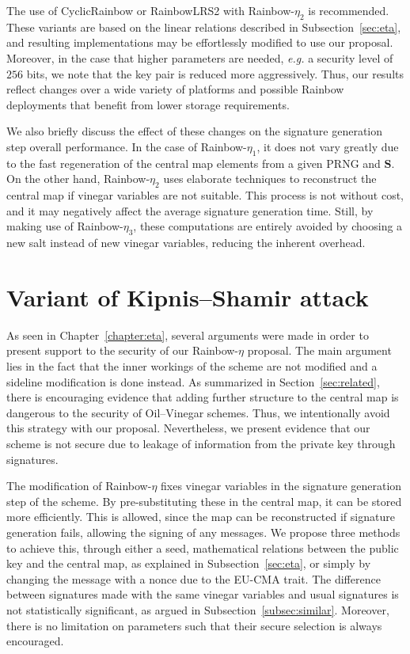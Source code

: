 \documentclass[12pt, a4paper, oneside]{memoir}
\theoremstyle{definition}
\begin{document}
The use of CyclicRainbow or RainbowLRS2 with Rainbow-$\eta_{2}$ is
recommended. These variants are based on the linear relations described in
Subsection~\ref{sec:eta}, and resulting implementations may be
effortlessly modified to use our proposal. Moreover, in the case that higher
parameters are needed, \emph{e.g.} a security level of $256$ bits, we note that
the key pair is reduced more aggressively. Thus, our results reflect
changes over a wide variety of platforms and possible Rainbow deployments that
benefit from lower storage requirements.

We also briefly discuss the effect of these changes on the signature generation
step overall performance. In the case of Rainbow-$\eta_{1}$, it does not vary
greatly due to the fast regeneration of the central map elements from a given
PRNG and $\mathbf{S}$. On the other hand, Rainbow-$\eta_{2}$ uses elaborate
techniques to reconstruct the central map if vinegar variables are not
suitable.  This process is not without cost, and it may negatively affect the
average signature generation time. Still, by making use of Rainbow-$\eta_{3}$,
these computations are entirely avoided by choosing a new salt instead of new
vinegar variables, reducing the inherent overhead.

\chapter{Variant of Kipnis--Shamir attack}\label{chapter:attack}

As seen in Chapter~\ref{chapter:eta}, several arguments were made in order to present support to the security of our Rainbow-$\eta$ proposal. The main argument lies in the fact that the inner workings of the scheme are not modified and a sideline modification is done instead. As summarized in Section~\ref{sec:related}, there is encouraging evidence that adding further structure to the central map is dangerous to the security of Oil--Vinegar schemes. Thus, we intentionally avoid this strategy with our proposal. Nevertheless, we present evidence that our scheme is not secure due to leakage of information from the private key through signatures.

The modification of Rainbow-$\eta$ fixes vinegar variables in the signature generation step of the scheme. By pre-substituting these in the central map, it can be stored more efficiently. This is allowed, since the map can be reconstructed if signature generation fails, allowing the signing of any messages. We propose three methods to achieve this, through either a seed, mathematical relations between the public key and the central map, as explained in Subsection~\ref{sec:eta}, or simply by changing the message with a nonce due to the EU-CMA trait. The difference between signatures made with the same vinegar variables and usual signatures is not statistically significant, as argued in Subsection~\ref{subsec:similar}. Moreover, there is no limitation on parameters such that their secure selection is always encouraged.
\end{document}
